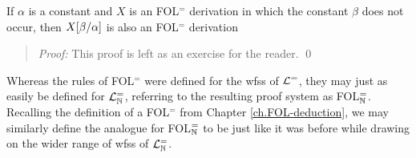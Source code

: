 %

\begin{Lthm} \label{lemma:prsub}
  If $\alpha$ is a constant and $X$ is an FOL$^=$ derivation in which the constant $\beta$ does not occur, then $X[\beta/\alpha]$ is also an FOL$^=$ derivation 
\end{Lthm}

\begin{quote} 
  \textit{Proof:}
  This proof is left as an exercise for the reader.
  \qed
\end{quote}


Whereas the rules of FOL$^=$ were defined for the wfss of $\mathcal{L}^{=}$, they may just as easily be defined for $\mathcal{L}^{=}_{\mathbb{N}}$, referring to the resulting proof system as FOL$^=_{\mathbb{N}}$. 
Recalling the definition of a FOL$^=$  from Chapter \ref{ch.FOL-deduction}, we may similarly define the analogue for FOL$^=_{\mathbb{N}}$ to be just like it was before while drawing on the wider range of wfss of $\mathcal{L}^{=}_{\mathbb{N}}$.

